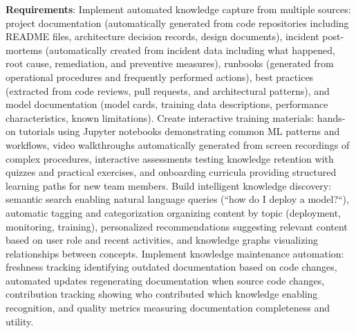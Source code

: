 \textbf{Requirements}: Implement automated knowledge capture from multiple sources: project documentation (automatically generated from code repositories including README files, architecture decision records, design documents), incident post-mortems (automatically created from incident data including what happened, root cause, remediation, and preventive measures), runbooks (generated from operational procedures and frequently performed actions), best practices (extracted from code reviews, pull requests, and architectural patterns), and model documentation (model cards, training data descriptions, performance characteristics, known limitations). Create interactive training materials: hands-on tutorials using Jupyter notebooks demonstrating common ML patterns and workflows, video walkthroughs automatically generated from screen recordings of complex procedures, interactive assessments testing knowledge retention with quizzes and practical exercises, and onboarding curricula providing structured learning paths for new team members. Build intelligent knowledge discovery: semantic search enabling natural language queries (``how do I deploy a model?``), automatic tagging and categorization organizing content by topic (deployment, monitoring, training), personalized recommendations suggesting relevant content based on user role and recent activities, and knowledge graphs visualizing relationships between concepts. Implement knowledge maintenance automation: freshness tracking identifying outdated documentation based on code changes, automated updates regenerating documentation when source code changes, contribution tracking showing who contributed which knowledge enabling recognition, and quality metrics measuring documentation completeness and utility.

